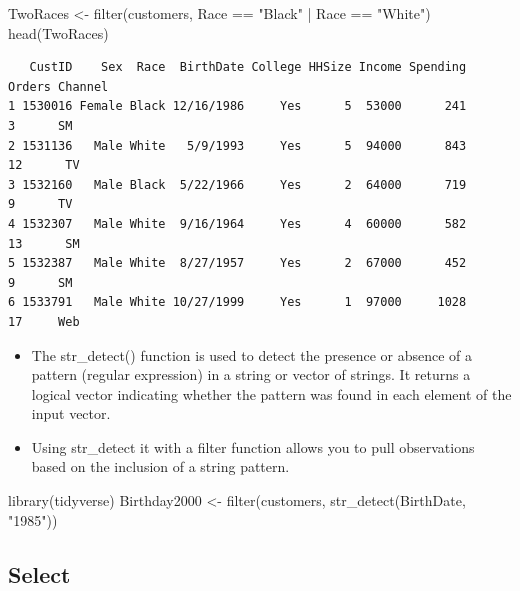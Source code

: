 \documentclass[
  letterpaper,
  DIV=11,
  numbers=noendperiod]{scrreprt}
\newenvironment{Shaded}{\begin{snugshade}}{\end{snugshade}}
\newcommand{\FunctionTok}[1]{\textcolor[rgb]{0.28,0.35,0.67}{#1}}
\newcommand{\NormalTok}[1]{\textcolor[rgb]{0.00,0.23,0.31}{#1}}
\newcommand{\OtherTok}[1]{\textcolor[rgb]{0.00,0.23,0.31}{#1}}
\newcommand{\SpecialCharTok}[1]{\textcolor[rgb]{0.37,0.37,0.37}{#1}}
\newcommand{\StringTok}[1]{\textcolor[rgb]{0.13,0.47,0.30}{#1}}
\providecommand{\tightlist}{%
  \setlength{\itemsep}{0pt}\setlength{\parskip}{0pt}}\usepackage{longtable,booktabs,array}
\begin{document}
\begin{Shaded}
\begin{Highlighting}[]
\NormalTok{TwoRaces }\OtherTok{\textless{}{-}} \FunctionTok{filter}\NormalTok{(customers, Race }\SpecialCharTok{==} \StringTok{"Black"} \SpecialCharTok{|}\NormalTok{ Race }\SpecialCharTok{==} \StringTok{"White"}\NormalTok{)}
\FunctionTok{head}\NormalTok{(TwoRaces)}
\end{Highlighting}
\end{Shaded}

\begin{verbatim}
   CustID    Sex  Race  BirthDate College HHSize Income Spending Orders Channel
1 1530016 Female Black 12/16/1986     Yes      5  53000      241      3      SM
2 1531136   Male White   5/9/1993     Yes      5  94000      843     12      TV
3 1532160   Male Black  5/22/1966     Yes      2  64000      719      9      TV
4 1532307   Male White  9/16/1964     Yes      4  60000      582     13      SM
5 1532387   Male White  8/27/1957     Yes      2  67000      452      9      SM
6 1533791   Male White 10/27/1999     Yes      1  97000     1028     17     Web
\end{verbatim}

\begin{itemize}
\tightlist
\item
  The str\_detect() function is used to detect the presence or absence
  of a pattern (regular expression) in a string or vector of strings. It
  returns a logical vector indicating whether the pattern was found in
  each element of the input vector.
\item
  Using str\_detect it with a filter function allows you to pull
  observations based on the inclusion of a string pattern.
\end{itemize}

\begin{Shaded}
\begin{Highlighting}[]
\FunctionTok{library}\NormalTok{(tidyverse)}
\NormalTok{Birthday2000 }\OtherTok{\textless{}{-}} \FunctionTok{filter}\NormalTok{(customers, }\FunctionTok{str\_detect}\NormalTok{(BirthDate, }\StringTok{"1985"}\NormalTok{))}
\end{Highlighting}
\end{Shaded}

\subsection{Select}\label{select}
\end{document}
